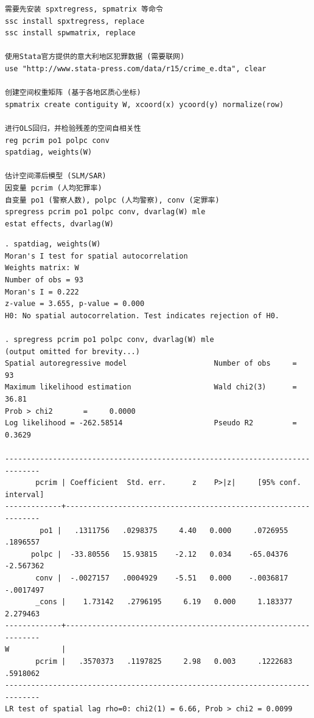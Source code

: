 \begin{tcolorbox}[title=在 Stata 中估计空间滞后模型 (SLM/SAR), colback=white, colframe=black, colbacktitle=white, coltitle=black,fonttitle=\bfseries]
\begin{lstlisting}[xleftmargin=2em, commentstyle=\color{black}]
需要先安装 spxtregress, spmatrix 等命令
ssc install spxtregress, replace
ssc install spwmatrix, replace

使用Stata官方提供的意大利地区犯罪数据 (需要联网)
use "http://www.stata-press.com/data/r15/crime_e.dta", clear

创建空间权重矩阵 (基于各地区质心坐标)
spmatrix create contiguity W, xcoord(x) ycoord(y) normalize(row)

进行OLS回归，并检验残差的空间自相关性
reg pcrim po1 polpc conv
spatdiag, weights(W)

估计空间滞后模型 (SLM/SAR)
因变量 pcrim (人均犯罪率)
自变量 po1 (警察人数), polpc (人均警察), conv (定罪率)
spregress pcrim po1 polpc conv, dvarlag(W) mle
estat effects, dvarlag(W)
\end{lstlisting}
\vspace{-2em}
\begin{Verbatim}[commandchars=\\\{\},xleftmargin=2em]
. spatdiag, weights(W)
Moran's I test for spatial autocorrelation
Weights matrix: W
Number of obs = 93
Moran's I = 0.222
z-value = 3.655, p-value = 0.000
H0: No spatial autocorrelation. Test indicates rejection of H0.

. spregress pcrim po1 polpc conv, dvarlag(W) mle
(output omitted for brevity...)
Spatial autoregressive model                    Number of obs     =         93
Maximum likelihood estimation                   Wald chi2(3)      =      36.81
Prob > chi2       =     0.0000
Log likelihood = -262.58514                     Pseudo R2         =     0.3629

------------------------------------------------------------------------------
       pcrim | Coefficient  Std. err.      z    P>|z|     [95% conf. interval]
-------------+----------------------------------------------------------------
        po1 |   .1311756   .0298375     4.40   0.000     .0726955    .1896557
      polpc |  -33.80556   15.93815    -2.12   0.034    -65.04376   -2.567362
       conv |  -.0027157   .0004929    -5.51   0.000    -.0036817   -.0017497
       _cons |    1.73142   .2796195     6.19   0.000     1.183377    2.279463
-------------+----------------------------------------------------------------
W            |
       pcrim |   .3570373   .1197825     2.98   0.003     .1222683    .5918062
------------------------------------------------------------------------------
LR test of spatial lag rho=0: chi2(1) = 6.66, Prob > chi2 = 0.0099


\end{Verbatim}
\end{tcolorbox}
